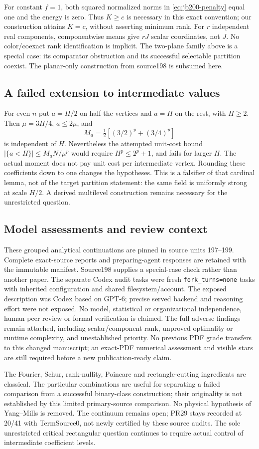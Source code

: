 For constant $f=1$, both squared normalized norms in
\eqref{eq:jb200-penalty} equal one and the energy is zero. Thus $K\ge c$
is necessary in this exact convention; our construction attains $K=c$,
without asserting minimum rank. For $r$ independent real components,
componentwise means give $rJ$ scalar coordinates, not $J$. No color/coexact
rank identification is implicit. The two-plane family above is a special
case: its comparator obstruction and its successful selectable partition
coexist. The planar-only construction from source198 is subsumed here.

\subsection{A failed extension to intermediate values}
For even $n$ put $a=H/2$ on half the vertices and $a=H$ on the rest, with
$H\ge2$. Then $\mu=3H/4$, $a\le2\mu$, and
\[
 M_a=\tfrac12[(3/2)^p+(3/4)^p]
\]
is independent of $H$. Nevertheless the attempted unit-cost bound
$|\{a<H\}|\le M_aN/\mu^p$ would require $H^p\le2^p+1$, and fails for
larger $H$. The actual moment does not pay unit cost per intermediate
vertex. Rounding these coefficients down to one changes the hypotheses.
This is a falsifier of that cardinal lemma, not of the target partition
statement: the same field is uniformly strong at scale $H/2$. A derived
multilevel construction remains necessary for the unrestricted question.

\subsection{Model assessments and review context}
These grouped analytical continuations are pinned in source units 197--199.
Complete exact-source reports and preparing-agent responses are retained
with the immutable manifest. Source198 supplies a special-case check rather
than another paper. The separate Codex audit tasks were fresh
\texttt{fork\_turns=none} tasks with inherited configuration and shared
filesystem/account. The exposed description was Codex based on GPT-6;
precise served backend and reasoning effort were not exposed. No model,
statistical or organizational independence, human peer review or formal
verification is claimed. The full adverse findings remain attached,
including scalar/component rank, unproved optimality or runtime complexity,
and unestablished priority. No previous PDF grade transfers to this changed
manuscript; an exact-PDF numerical assessment and visible stars are still
required before a new publication-ready claim.

The Fourier, Schur, rank-nullity, Poincare and rectangle-cutting ingredients
are classical. The particular combinations are useful for separating a
failed comparison from a successful binary-class construction; their
originality is not established by this limited primary-source comparison.
No physical hypothesis of Yang--Mills is removed. The continuum remains
open; PR29 stays recorded at 20/41 with TermSource0, not newly certified by
these source audits. The sole unrestricted critical rectangular question
continues to require actual control of intermediate coefficient levels.
